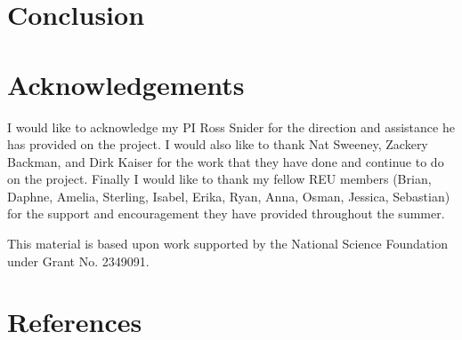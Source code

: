 \documentclass[psamsfonts]{amsart}
\theoremstyle{definition}
\theoremstyle{remark}
\numberwithin{equation}{section}
\begin{document}
\section{Conclusion}


\section{Acknowledgements}
I would like to acknowledge my PI Ross Snider for the direction and assistance he has provided on the project. I would also like to thank Nat Sweeney, Zackery Backman, and Dirk Kaiser for the work that they have done and continue to do on the project. Finally I would like to thank my fellow REU members (Brian, Daphne, Amelia, Sterling, Isabel, Erika, Ryan, Anna, Osman, Jessica, Sebastian) for the support and encouragement they have provided throughout the summer.

This material is based upon work supported by the National Science Foundation under Grant No. 2349091.


\section{References}
\nocite{*}


\end{document}
